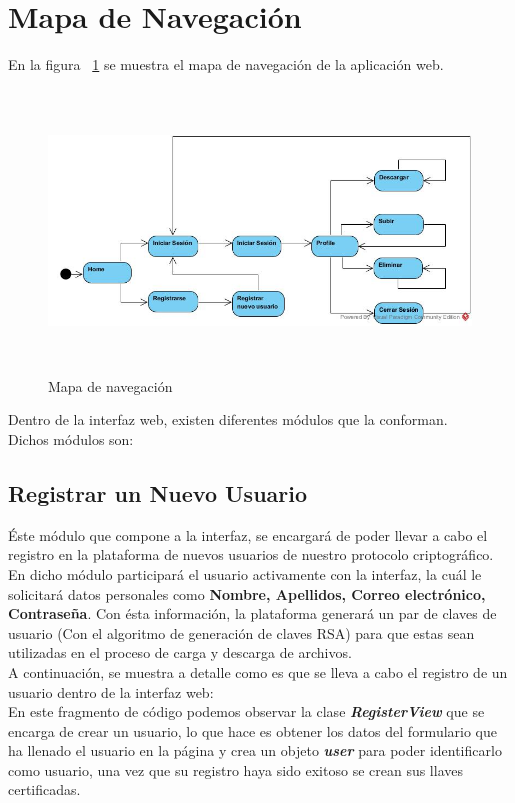 \section{Mapa de Navegación}
En la figura  ~\ref{fig:6-1-1} se muestra el mapa de navegación de la aplicación web.

			\begin{figure}[H]
			\centering
			\includegraphics[width=14cm, height=7.5cm]{./images/MapaDeNavegacion.jpg}
			\caption{Mapa de navegación}
			\label{fig:6-1-1} 
			\end{figure}

Dentro de la interfaz web, existen diferentes módulos que la conforman. \\ Dichos módulos son: 

\subsection{Registrar un Nuevo Usuario} 
Éste módulo que compone a la interfaz, se encargará de poder llevar a cabo el registro en la plataforma de nuevos usuarios de nuestro protocolo criptográfico. En dicho módulo participará el usuario activamente con la interfaz, la cuál le solicitará datos personales como \textbf{Nombre, Apellidos, Correo electrónico, Contraseña}. Con ésta información, la plataforma generará un par de claves de usuario (Con el algoritmo de generación de claves RSA) para que estas sean utilizadas en el proceso de carga y descarga de archivos. \\ 

A continuación, se muestra a detalle como es que se lleva a cabo el registro de un usuario dentro de la interfaz web: \\ 

En este fragmento de código podemos observar la clase \textbf{\textit{RegisterView}} que se encarga de crear un usuario, lo que hace es obtener los datos del formulario que ha llenado el usuario en la página y crea un objeto \textbf{\textit{user}} para poder identificarlo como usuario, una vez que su registro haya sido exitoso se crean sus llaves certificadas.

